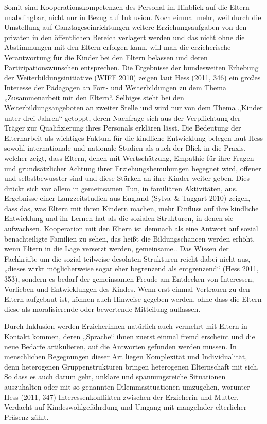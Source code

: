 Somit sind Kooperationskompetenzen des Personal im Hinblick auf die Eltern unabdingbar, nicht nur in Bezug auf Inklusion. 
Noch einmal mehr, weil durch die Umstellung auf Ganztageseinrichtungen weitere Erziehungsaufgaben von den privaten in den öffentlichen Bereich verlagert werden und das nicht ohne die Abstimmungen mit den Eltern erfolgen kann, will man die erzieherische Verantwortung für die Kinder bei den Eltern belassen und deren Partizipationswünschen entsprechen. Die Ergebnisse der bundesweiten Erhebung der Weiterbildungsinitiative (WIFF 2010) zeigen laut Hess (2011, 346) ein großes Interesse der Pädagogen an Fort- und Weiterbildungen zu dem Thema „Zusammenarbeit mit den Eltern“. Selbiges steht bei den Weiterbildungsangeboten an zweiter Stelle und wird nur von dem Thema „Kinder unter drei Jahren“ getoppt, deren Nachfrage sich aus der Verpflichtung der Träger zur Qualifizierung ihres Personals erklären lässt. Die Bedeutung der Elternarbeit als wichtiges Faktum für die kindliche Entwicklung belegen laut Hess sowohl internationale und nationale Studien als auch der Blick in die Praxis, welcher zeigt, dass Eltern, denen mit Wertschätzung, Empathie für ihre Fragen und grundsätzlicher Achtung ihrer Erziehungsbemühungen begegnet wird, offener und selbstbewusster sind und diese Stärken an ihre Kinder weiter geben. Dies drückt sich vor allem in gemeinsamen Tun, in familiären Aktivitäten, aus. 
Ergebnisse einer Langzeitstudien aus England (Sylva~\& Taggart 2010) zeigen, dass das, was Eltern mit ihren Kindern machen, mehr Einfluss auf ihre kindliche Entwicklung und ihr Lernen hat als die sozialen Strukturen, in denen sie aufwachsen.  
Kooperation mit den Eltern ist demnach als eine Antwort auf sozial benachteiligte Familien zu sehen, das heißt die Bildungschancen werden erhöht, wenn Eltern in die Lage versetzt werden, gemeinsame.. Das Wissen der Fachkräfte um die sozial teilweise desolaten Strukturen reicht dabei nicht aus, „dieses wirkt möglicherweise sogar eher begrenzend als entgrenzend“ (Hess 2011, 353), sondern es bedarf der gemeinsamen Freude am Entdecken von Interessen, Vorlieben und Entwicklungen des Kindes. Wenn erst einmal Vertrauen zu den Eltern aufgebaut ist, können auch Hinweise gegeben werden, ohne dass die Eltern diese als moralisierende oder bewertende Mitteilung auffassen.

Durch Inklusion werden Erzieherinnen natürlich auch vermehrt mit Eltern in Kontakt kommen, deren „Sprache“ ihnen zuerst einmal fremd erscheint und die neue Bedarfe artikulieren, auf die Antworten gefunden werden müssen. In menschlichen Begegnungen dieser Art liegen Komplexität und Individualität, denn heterogenen Gruppenstrukturen bringen heterogenen Elternschaft mit sich. So dass es auch darum geht, unklare und spannungsreiche Situationen auszuhalten oder mit so genannten Dilemmasituationen umzugehen, worunter Hess (2011, 347) Interessenkonflikten zwischen der Erzieherin und Mutter, Verdacht auf Kindeswohlgefährdung und Umgang mit mangelnder elterlicher Präsenz zählt. 

